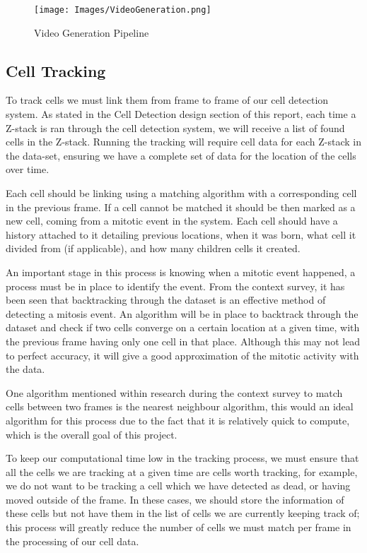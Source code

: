 \documentclass[12pt a4paper]{article}
\begin{document}
\begin{figure}
    \centering
    \texttt{[image: Images/VideoGeneration.png]}
    \caption{Video Generation Pipeline}
    \label{fig:vidGenPipe}
\end{figure}
\subsection{Cell Tracking}
To track cells we must link them from frame to frame of our cell detection system. As stated in the Cell Detection design section of this report, each time a Z-stack is ran through the cell detection system, we will receive a list of found cells in the Z-stack. Running the tracking will require cell data for each Z-stack in the data-set, ensuring we have a complete set of data for the location of the cells over time.

Each cell should be linking using a matching algorithm with a corresponding cell in the previous frame. If a cell cannot be matched it should be then marked as a new cell, coming from a mitotic event in the system. Each cell should have a history attached to it detailing previous locations, when it was born, what cell it divided from (if applicable), and how many children cells it created.

An important stage in this process is knowing when a mitotic event happened, a process must be in place to identify the event. From the context survey, it has been seen that backtracking through the dataset is an effective method of detecting a mitosis event. An algorithm will be in place to backtrack through the dataset and check if two cells converge on a certain location at a given time, with the previous frame having only one cell in that place. Although this may not lead to perfect accuracy, it will give a good approximation of the mitotic activity with the data. 

One algorithm mentioned within research during the context survey to match cells between two frames is the nearest neighbour algorithm, this would an ideal algorithm for this process due to the fact that it is relatively quick to compute, which is the overall goal of this project. 

To keep our computational time low in the tracking process, we must ensure that all the cells we are tracking at a given time are cells worth tracking, for example, we do not want to be tracking a cell which we have detected as dead, or having moved outside of the frame. In these cases, we should store the information of these cells but not have them in the list of cells we are currently keeping track of; this process will greatly reduce the number of cells we must match per frame in the processing of our cell data.
\end{document}
